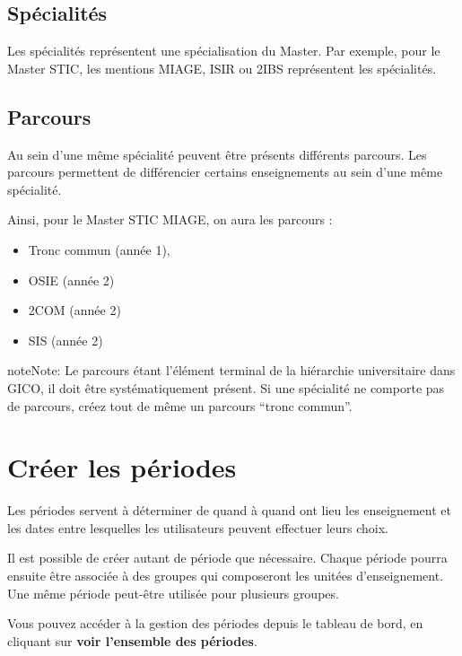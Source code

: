 \documentclass[letterpaper,10pt,french]{sphinxmanual}
\begin{document}
\subsection{Spécialités}
\label{admin:specialites}
Les spécialités représentent une spécialisation du Master. Par exemple, pour le Master STIC, les mentions MIAGE, ISIR ou 2IBS représentent les spécialités.


\subsection{Parcours}
\label{admin:parcours}
Au sein d'une même spécialité peuvent être présents différents parcours. Les parcours permettent de différencier certains enseignements au sein d'une même spécialité.

Ainsi, pour le Master STIC MIAGE, on aura les parcours :
\begin{itemize}
\item {} 
Tronc commun (année 1),

\item {} 
OSIE (année 2)

\item {} 
2COM (année 2)

\item {} 
SIS (année 2)

\end{itemize}

\begin{notice}{note}{Note:}
Le parcours étant l'élément terminal de la hiérarchie universitaire dans GICO, il doit être systématiquement présent. Si une spécialité ne comporte pas de parcours, créez tout de même un parcours ``tronc commun''.
\end{notice}


\section{Créer les périodes}
\label{admin:creer-les-periodes}
Les périodes servent à déterminer de quand à quand ont lieu les enseignement et les dates entre lesquelles les utilisateurs peuvent effectuer leurs choix.

Il est possible de créer autant de période que nécessaire. Chaque période pourra ensuite être associée à des groupes qui composeront les unitées d'enseignement. Une même période peut-être utilisée pour plusieurs groupes.

Vous pouvez accéder à la gestion des périodes depuis le tableau de bord, en cliquant sur \textbf{voir l'ensemble des périodes}.
\end{document}
